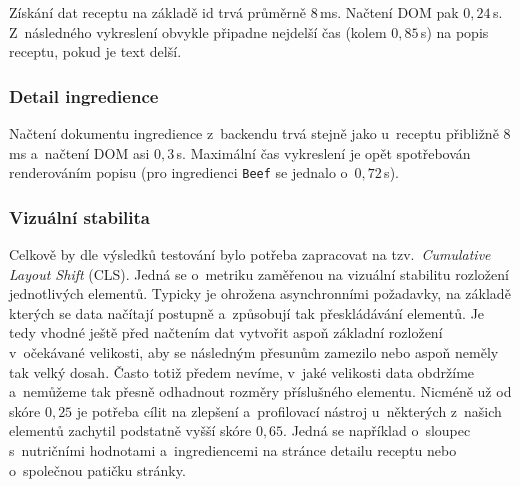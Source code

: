 Získání dat receptu na základě id trvá průměrně $8\,$ms. Načtení DOM pak $0,24\,$s. Z~následného vykreslení obvykle připadne nejdelší čas (kolem $0,85\,$s) na popis receptu, pokud je text delší.

\subsubsection{Detail ingredience}

Načtení dokumentu ingredience z~backendu trvá stejně jako u~receptu přibližně $8\,$ms a~načtení DOM asi $0,3\,$s. Maximální čas vykreslení je opět spotřebován renderováním popisu (pro ingredienci \texttt{Beef} se jednalo o~$0,72\,$s).

\subsubsection{Vizuální stabilita}

Celkově by dle výsledků testování bylo potřeba zapracovat na tzv.~\emph{Cumulative Layout Shift} (CLS). Jedná se o~metriku zaměřenou na vizuální stabilitu rozložení jednotlivých elementů. Typicky je ohrožena asynchronními požadavky, na základě kterých se data načítají postupně a~způsobují tak přeskládávání elementů. Je tedy vhodné ještě před načtením dat vytvořit aspoň základní rozložení v~očekávané velikosti, aby se následným přesunům zamezilo nebo aspoň neměly tak velký dosah. Často totiž předem nevíme, v~jaké velikosti data obdržíme a~nemůžeme tak přesně odhadnout rozměry příslušného elementu. Nicméně už od skóre $0,25$ je potřeba cílit na zlepšení \citep{cls-metric} a~profilovací nástroj u~některých z~našich elementů zachytil podstatně vyšší skóre $0,65$. Jedná se například o~sloupec s~nutričními hodnotami a~ingrediencemi na stránce detailu receptu nebo o~společnou patičku stránky.